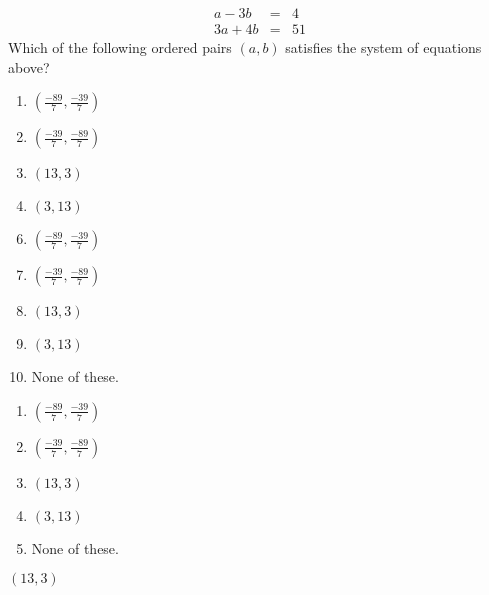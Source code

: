 
\begin{eqnarray*}
a-3b&=&4\\
3a+4b&=&51
\end{eqnarray*}
Which of the following ordered pairs $(a,b)$ satisfies the system of equations above?


\ifsat
	\begin{enumerate}[label=\Alph*)]
		\item {\Large$\left(\frac{-89}{7},\frac{-39}{7} \right) $ }
		\item {\Large$\left(\frac{-39}{7},\frac{-89}{7} \right) $ }
		\item $(13,3) $ %
		\item $(3,13) $
	\end{enumerate}
\else
\fi

\ifacteven
	\begin{enumerate}[label=\textbf{\Alph*.},itemsep=\fill,align=left]
		\setcounter{enumii}{5}
		\item {\Large$\left(\frac{-89}{7},\frac{-39}{7} \right) $ }
		\item {\Large$\left(\frac{-39}{7},\frac{-89}{7} \right) $ }
		\item $(13,3) $ %
		\addtocounter{enumii}{1}
		\item $(3,13) $
		\item None of these. 
	\end{enumerate}
\else
\fi

\ifactodd
	\begin{enumerate}[label=\textbf{\Alph*.},itemsep=\fill,align=left]
		\item {\Large$\left(\frac{-89}{7},\frac{-39}{7} \right) $ }
		\item {\Large$\left(\frac{-39}{7},\frac{-89}{7} \right) $ }
		\item $(13,3) $ %
		\item $(3,13) $
		\item None of these. 
	\end{enumerate}
\else
\fi

\ifgridin
 $(13,3) $ %
		
\else
\fi

